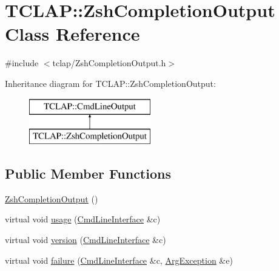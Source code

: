 \hypertarget{class_t_c_l_a_p_1_1_zsh_completion_output}{}\section{T\+C\+L\+A\+P\+:\+:Zsh\+Completion\+Output Class Reference}
\label{class_t_c_l_a_p_1_1_zsh_completion_output}


{\ttfamily \#include $<$tclap/\+Zsh\+Completion\+Output.\+h$>$}

Inheritance diagram for T\+C\+L\+A\+P\+:\+:Zsh\+Completion\+Output\+:\begin{figure}[H]
\begin{center}
\leavevmode
\includegraphics[height=2.000000cm]{class_t_c_l_a_p_1_1_zsh_completion_output}
\end{center}
\end{figure}
\subsection*{Public Member Functions}
\begin{DoxyCompactItemize}
\item 
\hyperlink{class_t_c_l_a_p_1_1_zsh_completion_output_a3bf15bc96487b014092eb2bc97fdf1de}{Zsh\+Completion\+Output} ()
\item 
virtual void \hyperlink{class_t_c_l_a_p_1_1_zsh_completion_output_a3ea685b174fce7ddf2353129863b49d7}{usage} (\hyperlink{class_t_c_l_a_p_1_1_cmd_line_interface}{Cmd\+Line\+Interface} \&c)
\item 
virtual void \hyperlink{class_t_c_l_a_p_1_1_zsh_completion_output_a543e705918d769d3d6f4090c403ed0c9}{version} (\hyperlink{class_t_c_l_a_p_1_1_cmd_line_interface}{Cmd\+Line\+Interface} \&c)
\item 
virtual void \hyperlink{class_t_c_l_a_p_1_1_zsh_completion_output_abcd0ba63a2ac7675d085877fc4d3e8cf}{failure} (\hyperlink{class_t_c_l_a_p_1_1_cmd_line_interface}{Cmd\+Line\+Interface} \&c, \hyperlink{class_t_c_l_a_p_1_1_arg_exception}{Arg\+Exception} \&e)
\end{DoxyCompactItemize}
